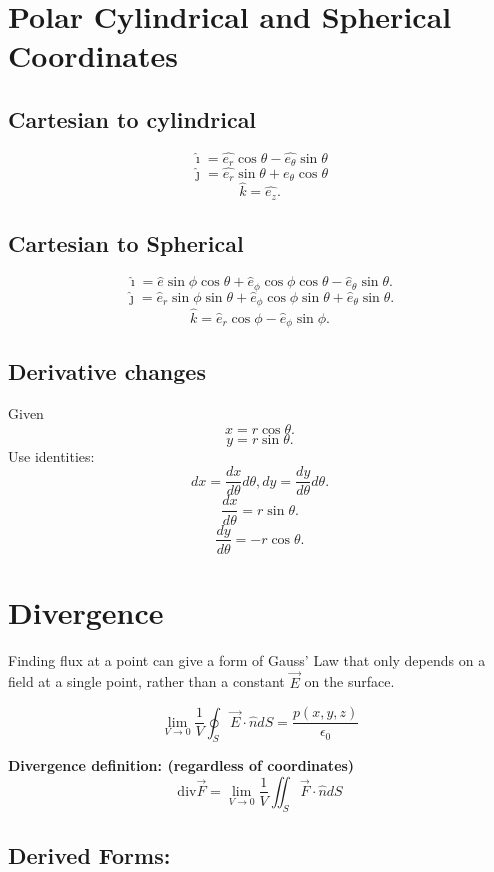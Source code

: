\section{Polar Cylindrical and Spherical Coordinates}
\subsection{Cartesian to cylindrical}
\[
\hat{\imath}=\hat{e_{r}}\cos\theta-\hat{e_{\theta}}\sin\theta	\]
\[\hat{\jmath}=\hat{e_{r}}\sin\theta+\hat{e_{\theta}}\cos\theta	\]
\[	\hat{k}=\hat{e_{z}}.\] 

\subsection{Cartesian to Spherical}
\[\hat{\imath}=\hat{e}\sin\phi\cos\theta+\hat{e}_{\phi}\cos \phi\cos\theta-\hat{e}_{\theta}\sin\theta.\] 
\[\hat{\jmath}=\hat{e}_{r}\sin \phi\sin\theta+\hat{e}_{\phi}\cos \phi\sin\theta+\hat{e}_{\theta}\sin\theta.\] 
\[\hat{k}=\hat{e}_{r}\cos \phi-\hat{e}_{\phi}\sin \phi.\] 

\subsection{Derivative changes}
Given
\[x=r\cos \theta.\] 
\[y=r\sin\theta.\] 
Use identities:
\[dx=\frac{dx}{d \theta}d \theta,dy=\frac{dy}{d \theta}d \theta.\] 
\[\frac{dx}{d \theta}=r\sin \theta.\] 
\[\frac{dy}{d \theta} = -r\cos\theta.\]
\section{Divergence}
Finding flux at a point can give a form of Gauss' Law that only depends on a field at a single point, rather than a constant $\vec{E}$ on the surface. 

\begin{equation}
	\label{}
	\lim_{V\to 0}\frac{1}{V}\oint_{S}\vec{E}\cdot\hat{n}dS=\frac{p(x,y,z)}{\epsilon_{0}}	
\end{equation}

	
\textbf{Divergence definition: (regardless of coordinates)}
\begin{equation}
	\label{}	
	\mbox{div}\vec{F}=\lim_{V\to 0}\frac{1}{V}\iint_{S}\vec{F}\cdot\hat{n}dS
\end{equation}

\subsection{Derived Forms: }

